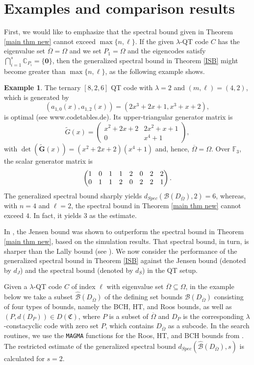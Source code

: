 \documentclass[11pt]{amsart}
\theoremstyle{plain}
\theoremstyle{definition}
\newtheorem{ex}[thm]{Example}
\numberwithin{equation}{section}
\newcommand{\F}{{\mathbb F}}
\begin{document}
\section{Examples and comparison results} \label{res sect}

First, we would like to emphasize that the spectral bound given in Theorem \ref{main thm new} cannot exceed $\max\{n,\ell\}$. If the given $\lambda$-QT code $C$ has the eigenvalue set $\overline{\Omega}=\Omega$ and we set $P_1=\Omega$ and the eigencodes satisfy $\bigcap_{i=1}^s\mathbb{C}_{P_i}=\{\mathbf{0}\}$, then the generalized spectral bound in Theorem \ref{ISB} might become greater than $\max\{n,\ell\}$, as the following example shows.

\begin{ex}\label{example1}
The ternary $[8,2,6]$ QT code with $\lambda=2$ and $(m,\ell)=(4,2)$, which is generated by 
\[
(a_{1,0}(x),a_{1,2}(x))=(2x^3 + 2x + 1, x^3 + x + 2),
\]
 is optimal (see www.codetables.de). Its upper-triangular generator matrix is
\[
\widetilde{G}(x) =
\begin{pmatrix}
x^2 + 2x + 2 & 2x^2 + x + 1 \\
0 & x^4+1
\end{pmatrix},
\]
with $\det(\widetilde{\mathbf{G}}(x))=(x^2 + 2x + 2)(x^4+1)$ and, hence, $\overline{\Omega}=\Omega$. Over $\F_3$, the scalar generator matrix is
\[
\setcounter{MaxMatrixCols}{20}
\begin{pmatrix}
1 & 0 & 1 & 1 & 2 & 0 & 2 & 2 \\
0 & 1 & 1 & 2 & 0 & 2 & 2 & 1
\end{pmatrix}.
\]
The generalized spectral bound sharply yields $d_{Spec}(\mathcal{B}(D_{\overline{\Omega}}),2)=6$, whereas, with $n=4$ and $\ell=2$, the spectral bound in Theorem \ref{main thm new} cannot exceed $4$. In fact, it yields $3$ as the estimate.
\end{ex}


In \cite{ELLOT}, the Jensen bound was shown to outperform the spectral bound in Theorem \ref{main thm new}, based on the simulation results. That spectral bound, in turn, is sharper than the Lally bound (see \cite{L2}). We now consider the performance of the generalized spectral bound in Theorem \ref{ISB} against the Jensen bound (denoted by $d_J$) and the spectral bound (denoted by $d_S$) in the QT setup. 

Given a $\lambda$-QT code $C$ of index $\ell$ with eigenvalue set $\overline{\Omega}\subseteq\Omega$, in the example below we take a subset $\widehat{\mathcal{B}}(D_{\overline{\Omega}})$ of the defining set bounds $\mathcal{B}(D_{\overline{\Omega}})$ consisting of four types of bounds, namely the BCH, HT, and Roos bounds, as well as $(P,d(D_{P})) \in D(\mathfrak{C})$, where $P$ is a subset of $\overline{\Omega}$ and $D_P$ is the corresponding $\lambda$-constacyclic code with zero set $P$, which contains $D_{\overline{\Omega}}$ as a subcode. In the search routines, we use the \texttt{MAGMA} functions for the Roos, HT, and BCH bounds from \cite{Piva2014}. The restricted estimate of the generalized spectral bound $d_{Spec}(\widehat{\mathcal{B}}(D_{\overline{\Omega}}),s)$ is calculated for $s=2$.
\end{document}
